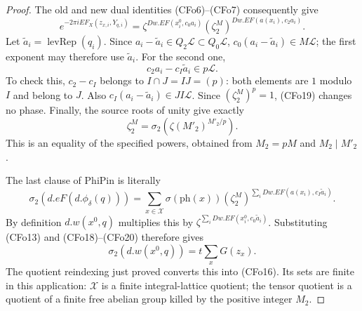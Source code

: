 \begin{proof}
The old and new dual identities (CFo6)--(CFo7) consequently give
\[
 e^{-2\pi iEF_X(z_{x,i},Y_{q,i})}
       =\zeta^{Dw.EF(x^0_i,c_0a_i)}
          (\zeta_2^M)^{Dw.EF(a(x_i),c_2a_i)}.             \tag{CFo18}
\]
Let \(\widetilde a_i=\operatorname{levRep}(q_i)\).
Since \(a_i-\widetilde a_i\in Q_2\mathcal L\subset Q_0\mathcal L\),
\(c_0(a_i-\widetilde a_i)\in M\mathcal L\); the first exponent
may therefore use \(\widetilde a_i\).
For the second one,
\[
                   c_2a_i-c_I\widetilde a_i
                                      \in p\mathcal L.   \tag{CFo19}
\]
To check this, \(c_2-c_I\) belongs to \(I\cap J=IJ=(p)\):
both elements are \(1\) modulo \(I\) and belong to \(J\).
Also \(c_I(a_i-\widetilde a_i)\in JI\mathcal L\).
Since \((\zeta_2^M)^p=1\), (CFo19) changes no phase.
Finally, the source roots of unity give exactly
\[
  \zeta_2^M
       =\sigma_2\!\left(\zeta(M'_2)^{M'_2/p}\right).       \tag{CFo20}
\]
This is an equality of the specified powers, obtained from
\(M_2=pM\) and \(M_2\mid M'_2\).

The last clause of \(\mathrm{PhiPin}\) is literally
\[
 \sigma_2(d.eF(d.\phi_\delta(q)))
   =\sum_{x\in\mathcal X}\sigma(\mathrm{ph}(x))
      (\zeta_2^M)^{
             \sum_iDw.EF(a(x_i),c_I\widetilde a_i)}.       \tag{CFo21}
\]
By definition \(d.w(x^0,q)\) multiplies this by
\(\zeta^{\sum_iDw.EF(x^0_i,c_0\widetilde a_i)}\).
Substituting (CFo13) and (CFo18)--(CFo20) therefore gives
\[
                    \sigma_2(d.w(x^0,q))=t\sum_xG(z_x).
\]
The quotient reindexing just proved converts this into (CFo16).
Its sets are finite in this application: \(\mathcal X\) is a
finite integral-lattice quotient; the tensor quotient is a
quotient of a finite free abelian group killed by the positive
integer \(M_2\).
\end{proof}

